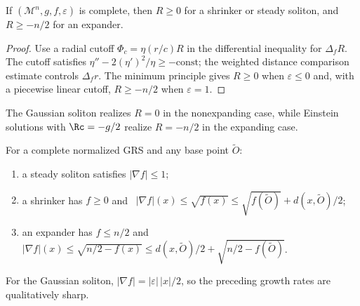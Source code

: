 \begin{theorem}
\label{thm:chow-iv-scalar-curvature-lower-bound}
If $(\mathcal M^n,g,f,\varepsilon)$ is complete, then $R\ge0$ for a shrinker
or steady soliton, and $R\ge-n/2$ for an expander.
\end{theorem}
\begin{proof}
\sketch
Use a radial cutoff $\Phi_c=\eta(r/c)R$ in the differential inequality for
$\Delta_fR$.  The cutoff satisfies
$\eta''-2(\eta')^2/\eta\ge-\mathrm{const}$; the weighted distance comparison
estimate controls $\Delta_fr$.  The minimum principle gives $R\ge0$ when
$\varepsilon\le0$ and, with a piecewise linear cutoff, $R\ge-n/2$ when
$\varepsilon=1$.
\end{proof}

\begin{remark}
\label{rem:chow-iv-scalar-lower-sharp}
The Gaussian soliton realizes $R=0$ in the nonexpanding case, while Einstein
solutions with $\Rc=-g/2$ realize $R=-n/2$ in the expanding case.
\end{remark}

\begin{theorem}
\label{thm:chow-iv-gradient-potential-bounds}
For a complete normalized GRS and any base point $\widetilde O$:
\begin{enumerate}
\item a steady soliton satisfies $|\nabla f|\le1$;
\item a shrinker has $f\ge0$ and
\ $|\nabla f|(x)\le\sqrt{f(x)}\le\sqrt{f(\widetilde O)}+d(x,\widetilde O)/2$;
\item an expander has $f\le n/2$ and
\ $|\nabla f|(x)\le\sqrt{n/2-f(x)}\le d(x,\widetilde O)/2+\sqrt{n/2-f(\widetilde O)}$.
\end{enumerate}
\end{theorem}

\begin{remark}
\label{rem:chow-iv-gradient-potential-sharp}
For the Gaussian soliton, $|\nabla f|=|\varepsilon|\,|x|/2$, so the preceding
growth rates are qualitatively sharp.
\end{remark}


